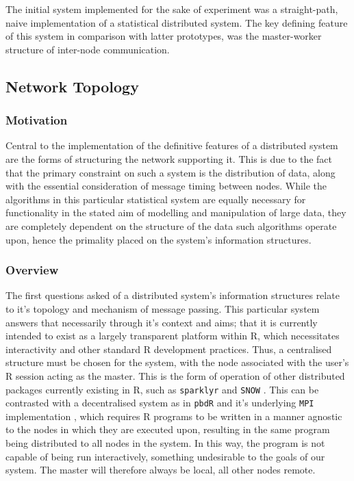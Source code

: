 The initial system implemented for the sake of experiment was a straight-path, naive implementation of a statistical distributed system.
The key defining feature of this system in comparison with latter prototypes, was the master-worker structure of inter-node communication.

\subsection{Network Topology}\label{sec:mw-topo}

\hypertarget{motivation}{%
\subsubsection{Motivation}\label{motivation}}

Central to the implementation of the definitive features of a
distributed system are the forms of structuring the network supporting it.
This is due to the fact that the primary constraint on such a system is
the distribution of data, along with the essential consideration of
message timing between nodes. While the algorithms in this particular
statistical system are equally necessary for functionality in the stated
aim of modelling and manipulation of large data, they are completely
dependent on the structure of the data such algorithms operate upon,
hence the primality placed on the system's information structures.

\hypertarget{overview}{%
\subsubsection{Overview}\label{overview}}

The first questions asked of a distributed system's information
structures relate to it's topology and mechanism of message passing.
This particular system answers that necessarily through it's context and
aims; that it is currently intended to exist as a largely transparent
platform within R, which necessitates interactivity and other standard R
development practices. Thus, a centralised structure must be chosen for
the system, with the node associated with the user's R session acting as
the master. This is the form of operation of other distributed packages
currently existing in R, such as \texttt{sparklyr} and \texttt{SNOW}
\cite{luraschi20}\cite{tierney18}. This can be contrasted with a
decentralised system as in \texttt{pbdR} and it's underlying
\texttt{MPI} implementation \cite{pbdR2012}, which requires R programs
to be written in a manner agnostic to the nodes in which they are
executed upon, resulting in the same program being distributed to all
nodes in the system. In this way, the program is not capable of being
run interactively, something undesirable to the goals of our system. The
master will therefore always be local, all other nodes remote.

